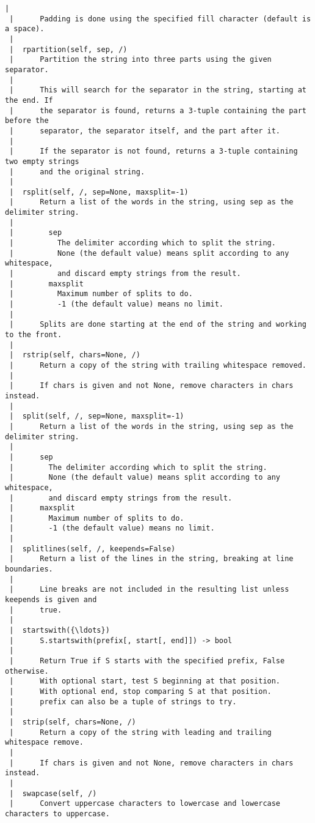 \begin{Verbatim}[commandchars=\\\{\},frame=single,framerule=0.3mm,rulecolor=\color{cellframecolor}]
 |      
 |      Padding is done using the specified fill character (default is a space).
 |  
 |  rpartition(self, sep, /)
 |      Partition the string into three parts using the given separator.
 |      
 |      This will search for the separator in the string, starting at the end. If
 |      the separator is found, returns a 3-tuple containing the part before the
 |      separator, the separator itself, and the part after it.
 |      
 |      If the separator is not found, returns a 3-tuple containing two empty strings
 |      and the original string.
 |  
 |  rsplit(self, /, sep=None, maxsplit=-1)
 |      Return a list of the words in the string, using sep as the delimiter string.
 |      
 |        sep
 |          The delimiter according which to split the string.
 |          None (the default value) means split according to any whitespace,
 |          and discard empty strings from the result.
 |        maxsplit
 |          Maximum number of splits to do.
 |          -1 (the default value) means no limit.
 |      
 |      Splits are done starting at the end of the string and working to the front.
 |  
 |  rstrip(self, chars=None, /)
 |      Return a copy of the string with trailing whitespace removed.
 |      
 |      If chars is given and not None, remove characters in chars instead.
 |  
 |  split(self, /, sep=None, maxsplit=-1)
 |      Return a list of the words in the string, using sep as the delimiter string.
 |      
 |      sep
 |        The delimiter according which to split the string.
 |        None (the default value) means split according to any whitespace,
 |        and discard empty strings from the result.
 |      maxsplit
 |        Maximum number of splits to do.
 |        -1 (the default value) means no limit.
 |  
 |  splitlines(self, /, keepends=False)
 |      Return a list of the lines in the string, breaking at line boundaries.
 |      
 |      Line breaks are not included in the resulting list unless keepends is given and
 |      true.
 |  
 |  startswith({\ldots})
 |      S.startswith(prefix[, start[, end]]) -> bool
 |      
 |      Return True if S starts with the specified prefix, False otherwise.
 |      With optional start, test S beginning at that position.
 |      With optional end, stop comparing S at that position.
 |      prefix can also be a tuple of strings to try.
 |  
 |  strip(self, chars=None, /)
 |      Return a copy of the string with leading and trailing whitespace remove.
 |      
 |      If chars is given and not None, remove characters in chars instead.
 |  
 |  swapcase(self, /)
 |      Convert uppercase characters to lowercase and lowercase characters to uppercase.

\end{Verbatim}
